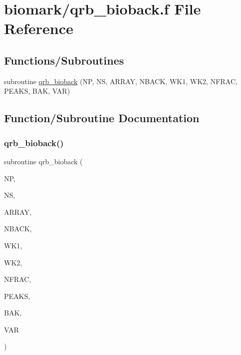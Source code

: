 \hypertarget{qrb__bioback_8f}{}\section{biomark/qrb\+\_\+bioback.f File Reference}
\label{qrb__bioback_8f}
\subsection*{Functions/\+Subroutines}
\begin{DoxyCompactItemize}
\item 
subroutine \hyperlink{qrb__bioback_8f_a6e868f4ce6ecd9c592bf9e932aeb4ce5}{qrb\+\_\+bioback} (NP, NS, A\+R\+R\+AY, N\+B\+A\+CK, W\+K1, W\+K2, N\+F\+R\+AC, P\+E\+A\+KS, B\+AK, V\+AR)
\end{DoxyCompactItemize}


\subsection{Function/\+Subroutine Documentation}
\mbox{\label{qrb__bioback_8f_a6e868f4ce6ecd9c592bf9e932aeb4ce5}} 
\subsubsection{\texorpdfstring{qrb\+\_\+bioback()}{qrb\_bioback()}}
{\footnotesize\ttfamily subroutine qrb\+\_\+bioback (\begin{DoxyParamCaption}\item[{integer}]{NP,  }\item[{integer}]{NS,  }\item[{double precision, dimension(np,ns)}]{A\+R\+R\+AY,  }\item[{integer}]{N\+B\+A\+CK,  }\item[{double precision, dimension(nback)}]{W\+K1,  }\item[{double precision, dimension(nback)}]{W\+K2,  }\item[{integer}]{N\+F\+R\+AC,  }\item[{double precision, dimension(np,ns)}]{P\+E\+A\+KS,  }\item[{double precision, dimension(np,ns)}]{B\+AK,  }\item[{double precision, dimension(np,ns)}]{V\+AR }\end{DoxyParamCaption})}

